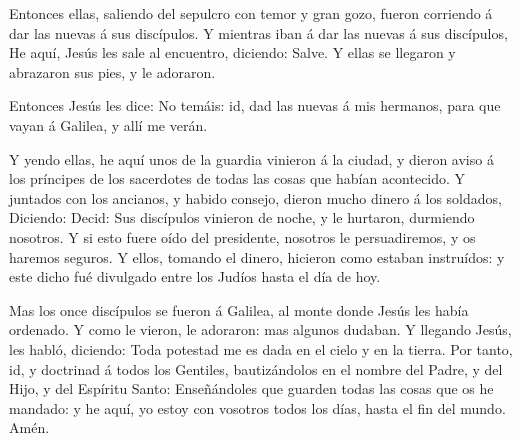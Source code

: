  Entonces ellas, saliendo del sepulcro con temor y gran
gozo, fueron corriendo á dar las nuevas á sus discípulos. Y mientras
iban á dar las nuevas á sus discípulos,  He aquí, Jesús les
sale al encuentro, diciendo: Salve. Y ellas se llegaron y abrazaron sus
pies, y le adoraron.

 Entonces Jesús les dice: No temáis: id, dad las nuevas á
mis hermanos, para que vayan á Galilea, y allí me verán.

 Y yendo ellas, he aquí unos de la guardia vinieron á la
ciudad, y dieron aviso á los príncipes de los sacerdotes de todas las
cosas que habían acontecido.  Y juntados con los ancianos,
y habido consejo, dieron mucho dinero á los soldados, 
Diciendo: Decid: Sus discípulos vinieron de noche, y le hurtaron,
durmiendo nosotros.  Y si esto fuere oído del presidente,
nosotros le persuadiremos, y os haremos seguros.  Y ellos,
tomando el dinero, hicieron como estaban instruídos: y este dicho fué
divulgado entre los Judíos hasta el día de hoy.

 Mas los once discípulos se fueron á Galilea, al monte
donde Jesús les había ordenado.  Y como le vieron, le
adoraron: mas algunos dudaban.  Y llegando Jesús, les
habló, diciendo: Toda potestad me es dada en el cielo y en la tierra.
 Por tanto, id, y doctrinad á todos los Gentiles,
bautizándolos en el nombre del Padre, y del Hijo, y del Espíritu Santo:
 Enseñándoles que guarden todas las cosas que os he
mandado: y he aquí, yo estoy con vosotros todos los días, hasta el fin
del mundo. Amén.
